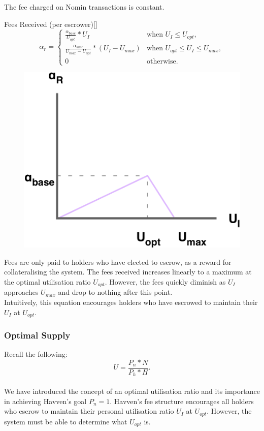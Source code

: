 \noindent The fee charged on Nomin transactions is constant.

\begin{namedthm}{Fees Received (per escrower)}[]
\[
\alpha_r = 
\begin{cases}
 \frac{\alpha_{base}}{U_{opt}} * U_I &\mbox{when } U_I \leq U_{opt}, \\ 
 \frac{\alpha_{base}}{U_{max} - U_{opt}} * (U_I  - U_{max}) &\mbox{when } U_{opt} \leq U_I \leq U_{max}, \\ 
 0 &\mbox{otherwise}.
 \end{cases}
\]
\end{namedthm}

\begin{figure}[h!]
    \centering
    \includegraphics[width=.55\textwidth]{img/fees-received}
\end{figure}

\noindent Fees are only paid to \HAV{} holders who have elected to escrow, as a reward for collateralising the system. The fees received increases linearly to a maximum at the optimal utilisation ratio $U_{opt}$. However, the fees quickly diminish as $U_I$ approaches $U_{max}$ and drop to nothing after this point. \\

\noindent Intuitively, this equation encourages \HAV{} holders who have escrowed to maintain their $U_I$ at $U_{opt}$. 

\subsubsection*{Optimal Supply}

\noindent Recall the following:
$$ U = \frac{P_n * N}{P_h * H}. $$ \\

\noindent We have introduced the concept of an optimal utilisation ratio and its importance in achieving Havven's  goal $P_n = 1$. Havven's fee structure encourages all \HAV{} holders who escrow to maintain their personal utilisation ratio $U_I$ at $U_{opt}$. However, the system must be able to determine what $U_{opt}$ is. \\

